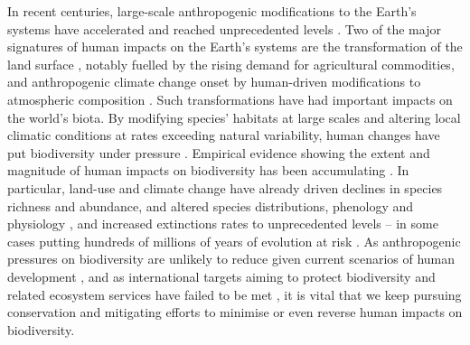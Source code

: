 
In recent centuries, large-scale anthropogenic modifications to the Earth's systems have accelerated and reached unprecedented levels \citep{Steffen2015}. Two of the major signatures of human impacts on the Earth's systems are the transformation of the land surface \citep{Ellis2010}, notably fuelled by the rising demand for agricultural commodities, and anthropogenic climate change onset by human-driven modifications to atmospheric composition \citep{Lewis2015}. Such transformations have had important impacts on the world's biota. By modifying species' habitats at large scales and altering local climatic conditions at rates exceeding natural variability, human changes have put biodiversity under pressure \citep{Maxwell2016}. Empirical evidence showing the extent and magnitude of human impacts on biodiversity has been accumulating \citep{Newbold2015, Young2016, Daru2021}. In particular, land-use and climate change have already driven declines in species richness and abundance, and altered species distributions, phenology and physiology \citep{Portner2008, Chown2010, Chen2011, Dirzo2014, Lenoir2015, Newbold2015, Soroye2020, Inouye2022, Butchart2010}, and increased extinctions rates to unprecedented levels \citep{Barnosky2011, Ceballos2015, DeVos2015} -- in some cases putting hundreds of millions of years of evolution at risk \citep{Nowakowski2018a, IUCN2020}. As anthropogenic pressures on biodiversity are unlikely to reduce given current scenarios of human development \citep{Stehfest2019}, and as international targets aiming to protect biodiversity and related ecosystem services have failed to be met \citep{Buchanan2020}, it is vital that we keep pursuing conservation and mitigating efforts to minimise or even reverse human impacts on biodiversity.

